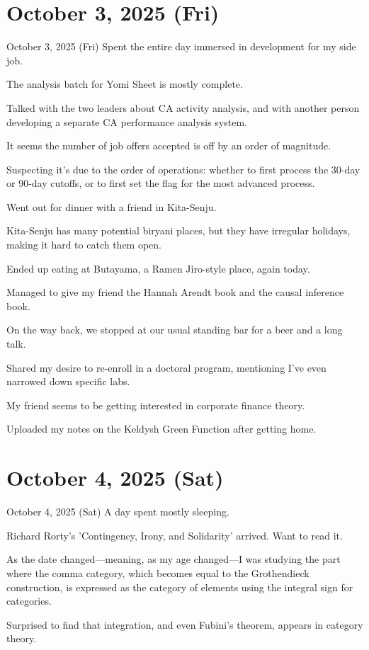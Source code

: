 \documentclass[dvipdfmx, autodetect-engine, aspectratio=169, 10.5pt]{beamer}
\begin{document}
\section{October 3, 2025 (Fri)}

\begin{frame}{October 3, 2025 (Fri)}
\scriptsize
Spent the entire day immersed in development for my side job.

The analysis batch for Yomi Sheet is mostly complete.

Talked with the two leaders about CA activity analysis, and with another person developing a separate CA performance analysis system.

It seems the number of job offers accepted is off by an order of magnitude.

Suspecting it's due to the order of operations: whether to first process the 30-day or 90-day cutoffs, or to first set the flag for the most advanced process.

Went out for dinner with a friend in Kita-Senju.

Kita-Senju has many potential biryani places, but they have irregular holidays, making it hard to catch them open.

Ended up eating at Butayama, a Ramen Jiro-style place, again today.

Managed to give my friend the Hannah Arendt book and the causal inference book.

On the way back, we stopped at our usual standing bar for a beer and a long talk.

Shared my desire to re-enroll in a doctoral program, mentioning I've even narrowed down specific labs.

My friend seems to be getting interested in corporate finance theory.

Uploaded my notes on the Keldysh Green Function after getting home.
\end{frame}

\section{October 4, 2025 (Sat)}

\begin{frame}{October 4, 2025 (Sat)}
A day spent mostly sleeping.

Richard Rorty's 'Contingency, Irony, and Solidarity' arrived. Want to read it.

As the date changed---meaning, as my age changed---I was studying the part where the comma category, which becomes equal to the Grothendieck construction, is expressed as the category of elements using the integral sign for categories.

Surprised to find that integration, and even Fubini's theorem, appears in category theory.
\end{frame}
\end{document}

